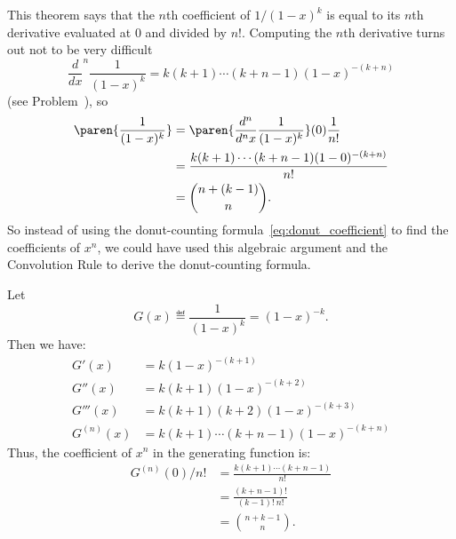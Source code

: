 This theorem says that the $n$th coefficient of $1 / (1 - x)^k$ is
equal to its $n$th derivative evaluated at 0 and divided by $n!$.
Computing the $n$th derivative turns out not to be very difficult
\[
\frac{d}{dx}^n \frac{1}{(1-x)^k} = k (k+1) \cdots (k + n - 1)(1-x)^{-(k+n)}
\]
(see Problem~), so
\begin{align*}
[x^n]\paren{\frac{1}{(1-x)^k}}
  & = \paren{\frac{d^n}{d^n x} \frac{1}{(1-x)^k}}(0)\frac{1}{n!}\\
  & = \frac{k (k+1) \cdots (k + n - 1)(1-0)^{-(k+n)}}{n!}\\
  & = \binom{n+ (k-1)}{n}.
\end{align*}
So instead of using the donut-counting
formula~\eqref{eq:donut_coefficient} to find the coefficients of
$x^n$, we could have used this algebraic argument and the Convolution
Rule to derive the donut-counting formula.

\begin{editingnotes}
Let
%
\[
G(x) \eqdef \frac{1}{(1-x)^k} = (1-x)^{-k}.
\]
%
Then we have:
%
\begin{align*}
G'(x) & = k (1-x)^{-(k+1)} \\
G''(x) & = k (k+1) (1-x)^{-(k+2)} \\
G'''(x) & = k (k+1) (k+2) (1-x)^{-(k+3)} \\
G^{(n)}(x) & = k (k+1) \cdots (k + n - 1)(1-x)^{-(k+n)}
\end{align*}
%
Thus, the coefficient of $x^n$ in the generating function is:
%
\begin{align*}
G^{(n)}(0) / n! & = \frac{k (k+1) \cdots (k + n - 1)}{n!} \\
                & = \frac{(k + n - 1)!}{(k - 1)! \ n!} \\
                & = \binom{n + k - 1}{n}.
\end{align*}

\end{editingnotes}

\begin{problems}
\practiceproblems
{}

\classproblems
{}

\homeworkproblems
{}

\examproblems
{}

\end{problems}

